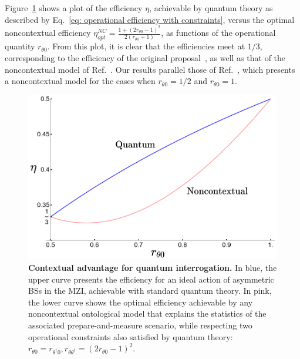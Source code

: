 \documentclass[letterpaper,onecolumn,12pt,accepted=2024-01-17]{article}
\begin{document}
Figure~\ref{fig: efficiency standard interrogation} shows a plot of the efficiency $\eta$, achievable by quantum theory  as described by Eq.~\eqref{eq: operational efficiency with constraints}, versus the optimal noncontextual efficiency $\eta^{NC}_{opt} = \frac{1 + (2r_{\theta 0}-1)^2}{2(r_{\theta 0}+1)}$, as functions of the operational quantity $r_{\theta 0}$. From this plot, it is clear that the efficiencies meet at $1/3$, corresponding to the efficiency of the original proposal~\cite{elitzur1993quantum}, as well as that of the noncontextual model of Ref.~\cite{catani2021interference}. Our results parallel those of Ref.~\cite{catani2021interference}, which presents a noncontextual model for the cases when $r_{\theta 0}=1/2$ and $r_{\theta 0}=1$. 




\begin{figure}[tb]
    \centering
    \includegraphics[width=\columnwidth]{Acc_Figures/ContextualAdvantage.png}
    \caption{\textbf{Contextual advantage for quantum interrogation.} In blue, the upper curve presents the efficiency for an ideal action of asymmetric BSs in the MZI, achievable with standard quantum theory. In pink, the lower curve shows the optimal efficiency achievable by any noncontextual ontological model that explains the statistics of the associated prepare-and-measure scenario, while respecting two operational constraints also satisfied by quantum theory: $r_{\theta 0} = r_{\theta^\dagger 0}, r_{\theta \theta^\dagger} = (2r_{\theta 0}-1)^2$.}
    \label{fig: efficiency standard interrogation}
\end{figure}
\end{document}
